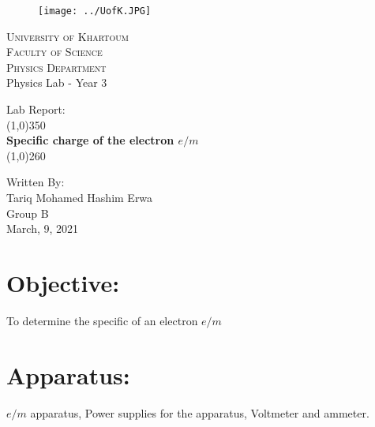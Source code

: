\documentclass[10pt,a4paper]{report}
\begin{document}
	\begin{titlepage}
		\begin{minipage}{0.5\textwidth}
			\begin{figure}[H]
				\texttt{[image: ../UofK.JPG]}\\
				[2cm]
			\end{figure}
		\end{minipage} \hfill
		\begin{minipage}{0.45\textwidth}
			\textsc{\LARGE University of Khartoum }\\
				[2mm]
				\textsc{\LARGE Faculty of Science } \\
				[1mm]
				\textsc{\Large Physics Department } \\
				[2mm]
				{\large Physics Lab - Year 3} \\ 
				[3mm]
		\end{minipage} 

		\begin{center}
			{\large Lab Report: } \\
			\line(1,0){350} \\
			[0.15in]
			\textbf{{\huge Specific charge of the electron $e/m$ }} \\
			[0.10in]
			\line(1,0){260} \\ [10cm]
		\end{center}
		
		\begin{flushleft}
				Written By:  \\
				{\large
							 Tariq Mohamed Hashim Erwa \\
							 Group B \\}
							 March, 9, 2021
		\end{flushleft}
	\end{titlepage}

\section*{\textbf{{Objective:}}}
   {\large To determine the specific of an 
   electron {\Large $e/m$}}

\section*{\textbf{{Apparatus:}}} 
   {\large $e/m$ apparatus, Power 
   supplies for the apparatus, Voltmeter and ammeter.}
\end{document}
